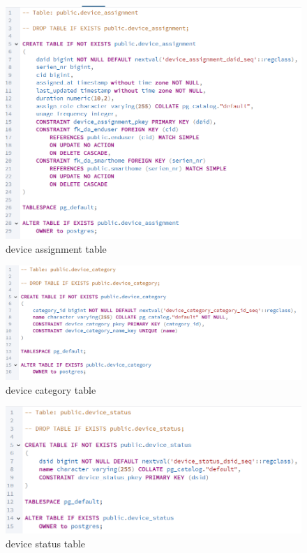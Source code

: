 \documentclass{article}
\begin{document}
\begin{figure}[H]
\centering
\includegraphics[width=\linewidth]{img/device_assignment.png}
\caption{device assignment table}
\end{figure}


\begin{figure}[H]
\centering
\includegraphics[width=\linewidth]{img/device_category.png}
\caption{device category table}
\end{figure}


\begin{figure}[H]
\centering
\includegraphics[width=\linewidth]{img/device_status.png}
\caption{device status table}
\end{figure}
\end{document}
